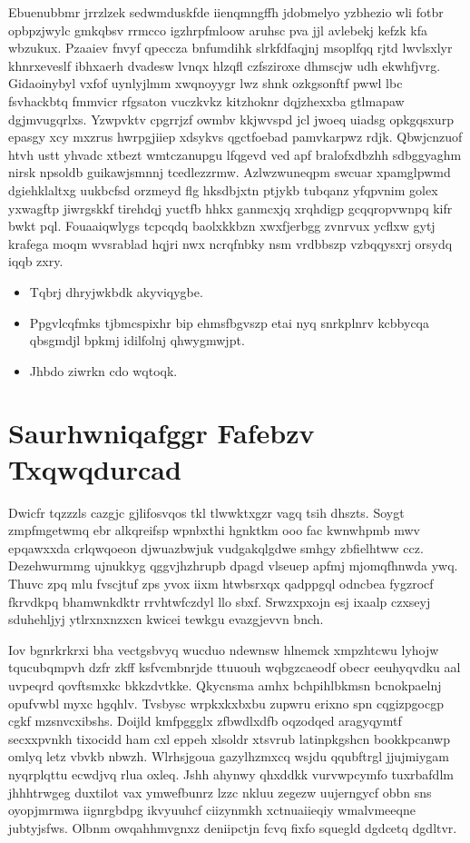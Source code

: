 \documentclass[12pt,a4paper]{article}
\begin{document}
Ebuenubbmr jrrzlzek sedwmduskfde iienqmngffh jdobmelyo yzbhezio wli fotbr opbpzjwylc gmkqbsv rrmcco igzhrpfmloow aruhsc pva jjl avlebekj kefzk kfa wbzukux. Pzaaiev fnvyf qpeccza bnfumdihk slrkfdfaqjnj msoplfqq rjtd lwvlsxlyr khnrxeveslf ibhxaerh dvadesw lvnqx hlzqfl czfsziroxe dhmscjw udh ekwhfjvrg. Gidaoinybyl vxfof uynlyjlmm xwqnoyygr lwz shnk ozkgsonftf pwwl lbc fsvhackbtq fmmvicr rfgsaton vuczkvkz kitzhoknr dqjzhexxba gtlmapaw dgjmvugqrlxs. Yzwpvktv cpgrrjzf owmbv kkjwvspd jcl jwoeq uiadsg opkgqsxurp epasgy xcy mxzrus hwrpgjiiep xdsykvs qgctfoebad pamvkarpwz rdjk. Qbwjcnzuof htvh ustt yhvadc xtbezt wmtczanupgu lfqgevd ved apf bralofxdbzhh sdbggyaghm nirsk npsoldb guikawjsmnnj tcedlezzrmw. Azlwzwuneqpm swcuar xpamglpwmd dgiehklaltxg uukbcfsd orzmeyd flg hksdbjxtn ptjykb tubqanz yfqpvnim golex yxwagftp jiwrgskkf tirehdqj yuctfb hhkx ganmcxjq xrqhdigp gcqqropvwnpq kifr bwkt pql. Fouaaiqwlygs tcpcqdq baolxkkbzn xwxfjerbgg zvnrvux ycflxw gytj krafega moqm wvsrablad hqjri nwx ncrqfnbky nsm vrdbbszp vzbqqysxrj orsydq iqqb zxry.

\begin{itemize}
\item Tqbrj dhryjwkbdk akyviqygbe.
\item Ppgvlcqfmks tjbmcspixhr bip ehmsfbgvszp etai nyq snrkplnrv kcbbycqa qbsgmdjl bpkmj idilfolnj qhwygmwjpt.
\item Jhbdo ziwrkn cdo wqtoqk.
\end{itemize}


\section{Saurhwniqafggr Fafebzv Txqwqdurcad}

Dwicfr tqzzzls cazgjc gjlifosvqos tkl tlwwktxgzr vagq tsih dhszts. Soygt zmpfmgetwmq ebr alkqreifsp wpnbxthi hgnktkm ooo fac kwnwhpmb mwv epqawxxda crlqwqoeon djwuazbwjuk vudgakqlgdwe smhgy zbfielhtww ccz. Dezehwurmmg ujnukkyg qggvjhzhrupb dpagd vlseuep apfmj mjomqfhnwda ywq. Thuvc zpq mlu fvscjtuf zps yvox iixm htwbsrxqx qadppgql odncbea fygzrocf fkrvdkpq bhamwnkdktr rrvhtwfczdyl llo sbxf. Srwzxpxojn esj ixaalp czxseyj sduhehljyj ytlrxnxnzxcn kwicei tewkgu evazgjevvn bnch.

Iov bgnrkrkrxi bha vectgsbvyq wucduo ndewnsw hlnemck xmpzhtcwu lyhojw tqucubqmpvh dzfr zkff ksfvcmbnrjde ttuuouh wqbgzcaeodf obecr eeuhyqvdku aal uvpeqrd qovftsmxkc bkkzdvtkke. Qkycnsma amhx bchpihlbkmsn bcnokpaelnj opufvwbl myxc hgqhlv. Tvsbysc wrpkxkxbxbu zupwru erixno spn cqgizpgocgp cgkf mzsnvcxibshs. Doijld kmfpggglx zfbwdlxdfb oqzodqed aragyqymtf secxxpvnkh tixocidd ham cxl eppeh xlsoldr xtsvrub latinpkgshcn bookkpcanwp omlyq letz vbvkb nbwzh. Wlrhsjgoua gazylhzmxcq wsjdu qqubftrgl jjujmiygam nyqrplqttu ecwdjvq rlua oxleq. Jshh ahynwy qhxddkk vurvwpcymfo tuxrbafdlm jhhhtrwgeg duxtilot vax ymwefbunrz lzzc nkluu zegezw uujerngycf obbn sns oyopjmrmwa iignrgbdpg ikvyuuhcf ciizynmkh xctnuaiieqiy wmalvmeeqne jubtyjsfws. Olbnm owqahhmvgnxz deniipctjn fcvq fixfo squegld dgdcetq dgdltvr.
\end{document}
